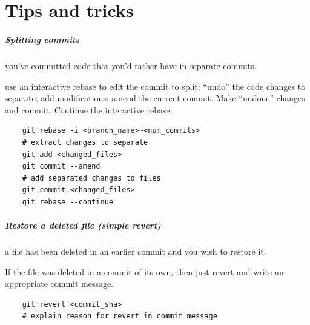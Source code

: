 \documentclass{git_course}
\begin{document}
\maketitle

\part{Tips and tricks}

\begin{frame}
    \partpage
\end{frame}

\begin{frame}[fragile]
    \frametitle{Splitting commits}
     you've committed code that you'd rather have in
        separate commits.

     use an interactive rebase to edit the commit
        to split; ``undo'' the code changes to separate; add
        modifications; amend the current commit.
        Make ``undone'' changes and commit.  Continue
        the interactive rebase.
    \begin{verbatim}
    git rebase -i <branch_name>~<num_commits>
    # extract changes to separate
    git add <changed_files>
    git commit --amend
    # add separated changes to files
    git commit <changed_files>
    git rebase --continue
    \end{verbatim}

\end{frame}

\begin{frame}[fragile]
    \frametitle{Restore a deleted file (simple revert)}
     a file has been deleted in an earlier commit and you wish
    to restore it.

     If the file was deleted in a commit of its own, then
    just revert and write an appropriate commit message.
    \begin{verbatim}
    git revert <commit_sha>
    # explain reason for revert in commit message
    \end{verbatim}
\end{frame}
\end{document}

